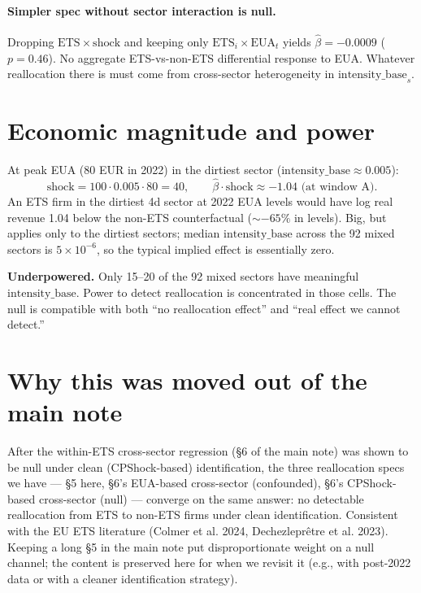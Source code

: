 \documentclass[11pt]{article}
\begin{document}
\paragraph{Simpler spec without sector interaction is null.} Dropping $\mathrm{ETS} \times \mathrm{shock}$ and keeping only $\mathrm{ETS}_i \times \mathrm{EUA}_t$ yields $\hat\beta = -0.0009$ ($p = 0.46$). No aggregate ETS-vs-non-ETS differential response to EUA. Whatever reallocation there is must come from cross-sector heterogeneity in $\mathrm{intensity\_base}_s$.

\section{Economic magnitude and power}

At peak EUA (80 EUR in 2022) in the dirtiest sector ($\mathrm{intensity\_base} \approx 0.005$):
\[
  \mathrm{shock} = 100 \cdot 0.005 \cdot 80 = 40, \qquad \hat\beta \cdot \mathrm{shock} \approx -1.04 \text{ (at window A)}.
\]
An ETS firm in the dirtiest 4d sector at 2022 EUA levels would have log real revenue 1.04 below the non-ETS counterfactual ($\sim -65\%$ in levels). Big, but applies only to the dirtiest sectors; median $\mathrm{intensity\_base}$ across the 92 mixed sectors is $5 \times 10^{-6}$, so the typical implied effect is essentially zero.

\textbf{Underpowered.} Only 15--20 of the 92 mixed sectors have meaningful $\mathrm{intensity\_base}$. Power to detect reallocation is concentrated in those cells. The null is compatible with both ``no reallocation effect'' and ``real effect we cannot detect.''

\section{Why this was moved out of the main note}

After the within-ETS cross-sector regression (§6 of the main note) was shown to be null under clean (CPShock-based) identification, the three reallocation specs we have --- §5 here, §6's EUA-based cross-sector (confounded), §6's CPShock-based cross-sector (null) --- converge on the same answer: no detectable reallocation from ETS to non-ETS firms under clean identification. Consistent with the EU ETS literature (Colmer et al. 2024, Dechezlepr\^etre et al. 2023). Keeping a long §5 in the main note put disproportionate weight on a null channel; the content is preserved here for when we revisit it (e.g., with post-2022 data or with a cleaner identification strategy).
\end{document}
